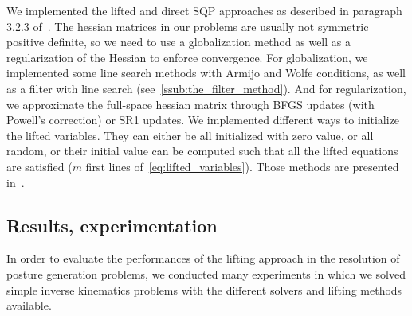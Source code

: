 We implemented the lifted and direct SQP approaches as described in paragraph 3.2.3 of~\cite{Albersmeyer:2010:LNM:1958447.1958472}.
The hessian matrices in our problems are usually not symmetric positive definite, so we need to use a globalization method as well as a regularization of the Hessian to enforce convergence.
For globalization, we implemented some line search methods with Armijo and Wolfe conditions, as well as a filter with line search (see~\ref{ssub:the_filter_method}).
And for regularization, we approximate the full-space hessian matrix through BFGS updates (with Powell's correction) or SR1 updates.
We implemented different ways to initialize the lifted variables.
They can either be all initialized with zero value, or all random, or their initial value can be computed such that all the lifted equations are satisfied ($m$ first lines of~\ref{eq:lifted_variables}).
Those methods are presented in~\cite{bonnans:springer:2002}.



\subsection{Results, experimentation}
\label{subsec:Results}

In order to evaluate the performances of the lifting approach in the resolution of posture generation problems, we conducted many experiments in which we solved simple inverse kinematics problems with the different solvers and lifting methods available.

